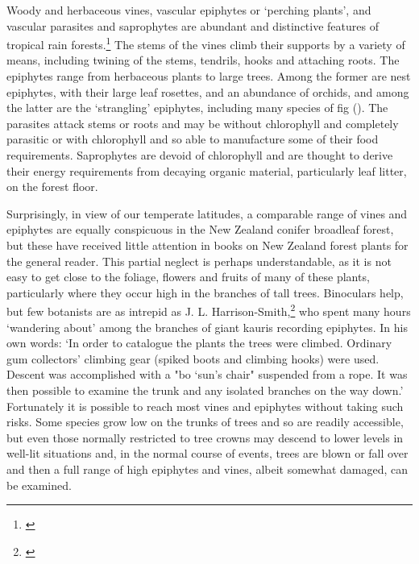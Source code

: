 Woody and herbaceous vines, vascular epiphytes or `perching plants', and vascular parasites and saprophytes are abundant and distinctive features of tropical rain forests.\footnote{\cite{richards1952tropical}}
The stems of the vines climb their supports by a variety of means, including twining of the stems, tendrils, hooks and attaching roots.
The epiphytes range from herbaceous plants to large trees.
Among the former are nest epiphytes, with their large leaf rosettes, and an abundance of orchids, and among the latter are the `strangling' epiphytes, including many species of fig ().
The parasites attack stems or roots and may be without chlorophyll and completely parasitic or with chlorophyll and so able to manufacture some of their food requirements.
Saprophytes are devoid of chlorophyll and are thought to derive their energy requirements from decaying organic material, particularly leaf litter, on the forest floor.

Surprisingly, in view of our temperate latitudes, a comparable range of vines and epiphytes are equally conspicuous in the New Zealand conifer broadleaf forest, but these have received little attention in books on New Zealand forest plants for the general reader.
This partial neglect is perhaps understandable, as it is not easy to get close to the foliage, flowers and fruits of many of these plants, particularly where they occur high in the branches of tall trees.
Binoculars help, but few botanists are as intrepid as J.
L.
Harrison-Smith,\footnote{\cite{harrisonsmith1938kauri}} who spent many hours `wandering about' among the branches of giant kauris recording epiphytes.
In his own words: `In order to catalogue the plants the trees were climbed.
Ordinary gum collectors' climbing gear (spiked boots and climbing hooks) were used.
Descent was accomplished with a "bo `sun's chair" suspended from a rope.
It was then possible to examine the trunk and any isolated branches on the way down.' Fortunately it is possible to reach most vines and epiphytes without taking such risks.
Some species grow low on the trunks of trees and so are readily accessible, but even those normally restricted to tree crowns may descend to lower levels in well-lit situations and, in the normal course of events, trees are blown or fall over and then a full range of high epiphytes and vines, albeit somewhat damaged, can be examined.

